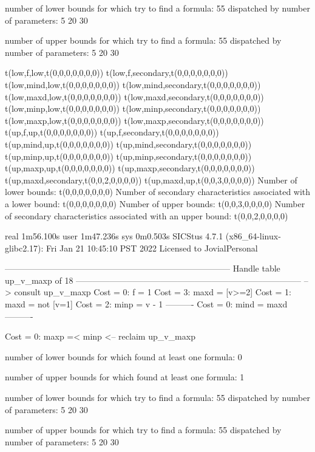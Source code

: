 number of lower bounds for which try to find a formula: 55
dispatched by number of parameters: 5  20  30

number of upper bounds for which try to find a formula: 55
dispatched by number of parameters: 5  20  30

t(low,f,low,t(0,0,0,0,0,0,0))
t(low,f,secondary,t(0,0,0,0,0,0,0))
t(low,mind,low,t(0,0,0,0,0,0,0))
t(low,mind,secondary,t(0,0,0,0,0,0,0))
t(low,maxd,low,t(0,0,0,0,0,0,0))
t(low,maxd,secondary,t(0,0,0,0,0,0,0))
t(low,minp,low,t(0,0,0,0,0,0,0))
t(low,minp,secondary,t(0,0,0,0,0,0,0))
t(low,maxp,low,t(0,0,0,0,0,0,0))
t(low,maxp,secondary,t(0,0,0,0,0,0,0))
t(up,f,up,t(0,0,0,0,0,0,0))
t(up,f,secondary,t(0,0,0,0,0,0,0))
t(up,mind,up,t(0,0,0,0,0,0,0))
t(up,mind,secondary,t(0,0,0,0,0,0,0))
t(up,minp,up,t(0,0,0,0,0,0,0))
t(up,minp,secondary,t(0,0,0,0,0,0,0))
t(up,maxp,up,t(0,0,0,0,0,0,0))
t(up,maxp,secondary,t(0,0,0,0,0,0,0))
t(up,maxd,secondary,t(0,0,2,0,0,0,0))
t(up,maxd,up,t(0,0,3,0,0,0,0))
Number of lower bounds:                                             t(0,0,0,0,0,0,0)
Number of secondary characteristics associated with a lower bound:  t(0,0,0,0,0,0,0)
Number of upper bounds:                                             t(0,0,3,0,0,0,0)
Number of secondary characteristics associated with an upper bound: t(0,0,2,0,0,0,0)

real	1m56.100s
user	1m47.236s
sys	0m0.503s
SICStus 4.7.1 (x86_64-linux-glibc2.17): Fri Jan 21 10:45:10 PST 2022
Licensed to JovialPersonal


--------------------------------------------------------------------------------
Handle table up_v_maxp of 18
--------------------------------------------------------------------------------
--> consult up_v_maxp
Cost =  0:  f    = 1
Cost =  3:  maxd = [v>=2]
Cost =  1:  maxd = not [v=1]
Cost =  2:  minp = v - 1
----------
Cost =  0:  mind = maxd
----------

Cost =  0:  maxp =< minp
<-- reclaim up_v_maxp

number of lower bounds for which found at least one formula: 0

number of upper bounds for which found at least one formula: 1

number of lower bounds for which try to find a formula: 55
dispatched by number of parameters: 5  20  30

number of upper bounds for which try to find a formula: 55
dispatched by number of parameters: 5  20  30

